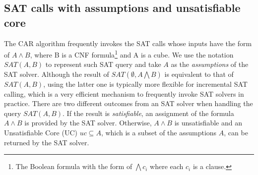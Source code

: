 \subsection{SAT calls with assumptions and unsatisfiable core}
The CAR algorithm frequently invokes the SAT calls whose inputs have the form of $A\wedge B$, where B is a CNF formula\footnote{The Boolean formula with the form of $\bigwedge c_i$ where each $c_i$ is a clause.} and A is a cube. We use the notation $SAT(A, B)$ to represent such SAT query and take $A$ as the \emph{assumptions} of the SAT solver. Although the result of $SAT(\emptyset,A \bigwedge B)$ is equivalent to that of $SAT(A,B)$, using the latter one is typically more flexible for incremental SAT calling, which is a very efficient mechanism to frequently invoke SAT solvers in practice.   
There are two different outcomes from an SAT solver when handling the query $SAT (A, B)$. If the result is \emph{satisfiable}, an assignment of the formula $A\wedge B$ is provided by the SAT solver. Otherwise, $A\wedge B$ is unsatisfiable and an Unsatisfiable Core (UC) $uc\subseteq A$, which is a subset of the assumptions $A$, can be returned by the SAT solver.

\iffalse
In the CAR algorithm, A is usually an explicit state and B is $T \bigwedge B_{i}$, where $T$ is the transition system of $Sys=(V,I,T)$ and $B_{i}$ is the \textit{i}-th level of B-sequence(will describe in below).

A SAT call like $\mathit{SAT}(A,B)$ will have two possible outcomes: 

1.satisfied, we will then use \textbf{get\_assignment()} to get a satisfying assignment to literals in A and B. 

2.unsatisfied, we will then use \textbf{get\_unsat\_core()} to get an unsatisfiable core c that $ c \subseteq A $ and $ c \bigwedge T $ is unsatisfiable.


In mathematical logic, given an unsatisfiable Boolean propositional formula in conjunctive normal form, like $\mathit{SAT}(A,B)$, if the outcome is unsatisfied, a subset of clauses whose conjunction is still unsatisfiable is called an unsatisfiable core of the original formula. In the CAR algorithm, the unsatisfiable core comes from the assumption which means it only contains some of the literals from the assumption. For example, given an unsatisfied SAT call $\mathit{SAT}(A,B)$, where A is a conjunction of literals $A=l_{1}\cap l_{2}\cap l_{3}\cap ...\cap l_{n}$ and B is a conjunction of clause $B=c_{1}\cap c_{2}\cap...\cap c_{m}$. The obtained unsatisfiable core will be $u_{1}\cap u_{2}\cap...\cap u_{j} \quad u_{i}\in A \,(1\leq i\leq j)$.
\fi


